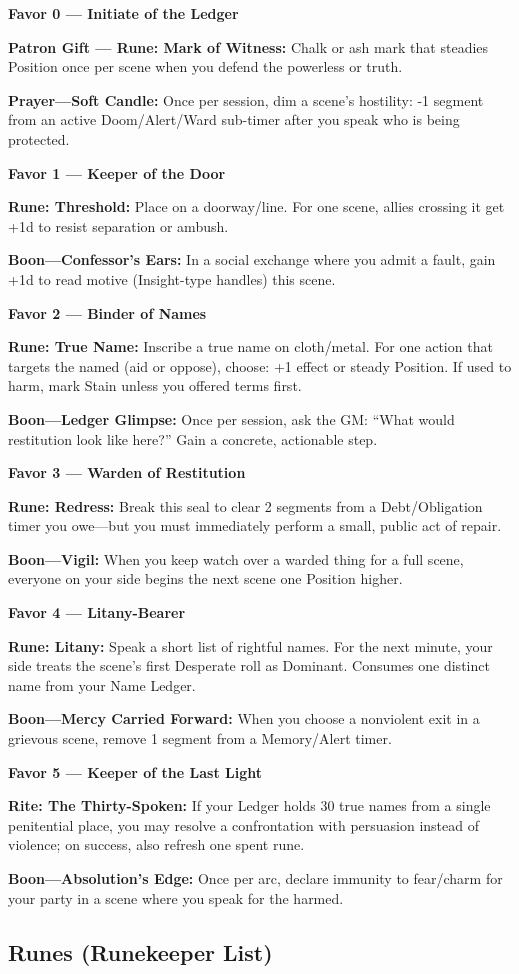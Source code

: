 \documentclass[18pt, letterpaper, twoside]{article}
\newcommand{\devotion}[2]{\noindent\textbf{Favor #1 --- #2}\par}
\newcommand{\rite}[2]{\noindent\textbf{#1:} #2\par}
\begin{document}
\begin{enumerate}
\devotion{0}{Initiate of the Ledger}
\rite{Patron Gift --- Rune: Mark of Witness}{Chalk or ash mark that steadies Position once per scene when you defend the powerless or truth.}
\rite{Prayer---Soft Candle}{Once per session, dim a scene's hostility: -1 segment from an active Doom/Alert/Ward sub-timer after you speak who is being protected.}

\devotion{1}{Keeper of the Door}
\rite{Rune: Threshold}{Place on a doorway/line. For one scene, allies crossing it get +1d to resist separation or ambush.}
\rite{Boon---Confessor's Ears}{In a social exchange where you admit a fault, gain +1d to read motive (Insight-type handles) this scene.}

\devotion{2}{Binder of Names}
\rite{Rune: True Name}{Inscribe a true name on cloth/metal. For one action that targets the named (aid or oppose), choose: +1 effect or steady Position. If used to harm, mark Stain unless you offered terms first.}
\rite{Boon---Ledger Glimpse}{Once per session, ask the GM: ``What would restitution look like here?'' Gain a concrete, actionable step.}

\devotion{3}{Warden of Restitution}
\rite{Rune: Redress}{Break this seal to clear 2 segments from a Debt/Obligation timer you owe---but you must immediately perform a small, public act of repair.}
\rite{Boon---Vigil}{When you keep watch over a warded thing for a full scene, everyone on your side begins the next scene one Position higher.}

\devotion{4}{Litany-Bearer}
\rite{Rune: Litany}{Speak a short list of rightful names. For the next minute, your side treats the scene's first Desperate roll as Dominant. Consumes one distinct name from your Name Ledger.}
\rite{Boon---Mercy Carried Forward}{When you choose a nonviolent exit in a grievous scene, remove 1 segment from a Memory/Alert timer.}

\devotion{5}{Keeper of the Last Light}
\rite{Rite: The Thirty-Spoken}{If your Ledger holds 30 true names from a single penitential place, you may resolve a confrontation with persuasion instead of violence; on success, also refresh one spent rune.}
\rite{Boon---Absolution's Edge}{Once per arc, declare immunity to fear/charm for your party in a scene where you speak for the harmed.}

\subsection{Runes (Runekeeper List)}


\end{enumerate}
\end{document}
